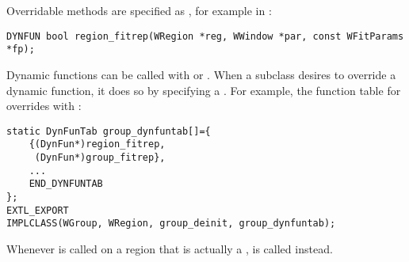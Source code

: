 Overridable methods are specified as , for example 
 in :

\begin{verbatim}
DYNFUN bool region_fitrep(WRegion *reg, WWindow *par, const WFitParams *fp);
\end{verbatim}

Dynamic functions can be called with  or .
When a subclass desires to override a dynamic function, it does so by 
specifying a . For example, the function
table for  overrides  with 
:

\begin{verbatim}
static DynFunTab group_dynfuntab[]={
    {(DynFun*)region_fitrep,
     (DynFun*)group_fitrep},
    ...
    END_DYNFUNTAB
};
EXTL_EXPORT
IMPLCLASS(WGroup, WRegion, group_deinit, group_dynfuntab);
\end{verbatim}

Whenever  is called on a region that is actually a 
,  is called instead.
